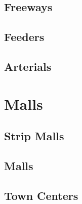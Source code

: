 \documentclass[8pt]{amsbook}
\begin{document}
\section{Freeways}
\section{Feeders}
\section{Arterials}
\chapter{Malls}
\minitoc
\section{Strip Malls}
\section{Malls}
\section{Town Centers}


\end{document}
